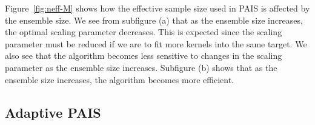 \documentclass[final]{siamltex}
\begin{document}
Figure~\ref{fig:neff-M} shows how the effective sample size used in
PAIS is affected by the ensemble size. We see from subfigure (a) that
as the ensemble size increases, the optimal scaling parameter
decreases. This is expected since the scaling parameter must be
reduced if we are to fit more kernels into the same target. We also
see that the algorithm becomes less sensitive to changes in the
scaling parameter as the ensemble size increases. Subfigure (b) shows
that as the ensemble size increases, the algorithm becomes more
efficient.


\subsection{Adaptive PAIS}\label{sec:adapt}

\end{document}
